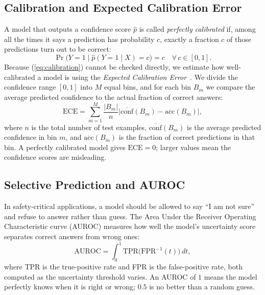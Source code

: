 \documentclass[twoside]{article}
\begin{document}
\subsection{Calibration and Expected Calibration Error}

A model that outputs a confidence score $\hat{p}$ is called
\emph{perfectly calibrated} if, among all the times it says a prediction
has probability $c$, exactly a fraction $c$ of those predictions turn
out to be correct:
\begin{equation}
  \Pr\!\bigl(Y=1 \mid \hat{p}(Y=1 \mid X)=c\bigr) = c
  \quad \forall\, c\in[0,1].
\label{eq:calibration}
\end{equation}
Because (\ref{eq:calibration}) cannot be checked directly, we estimate
how well-calibrated a model is using the \emph{Expected Calibration
Error}~\cite{naeini2015obtaining}. We divide the confidence range $[0,1]$
into $M$ equal bins, and for each bin $B_m$ we compare the average
predicted confidence to the actual fraction of correct answers:
\begin{equation}
  \mathrm{ECE} =
  \sum_{m=1}^{M} \frac{|B_m|}{n}
  \bigl|\overline{\mathrm{conf}}(B_m) - \overline{\mathrm{acc}}(B_m)\bigr|,
  \label{eq:ece}
\end{equation}
where $n$ is the total number of test examples,
$\overline{\mathrm{conf}}(B_m)$ is the average predicted confidence in
bin $m$, and $\overline{\mathrm{acc}}(B_m)$ is the fraction of correct
predictions in that bin. A perfectly calibrated model gives
$\mathrm{ECE}=0$; larger values mean the confidence scores are
misleading.

\subsection{Selective Prediction and AUROC}

In safety-critical applications, a model should be allowed to say
``I am not sure'' and refuse to answer rather than guess. The Area Under
the Receiver Operating Characteristic curve (AUROC) measures how well
the model's uncertainty score separates correct answers from wrong ones:
\begin{equation}
  \mathrm{AUROC} = \int_0^1 \mathrm{TPR}\bigl(\mathrm{FPR}^{-1}(t)\bigr)\,dt,
\end{equation}
where TPR is the true-positive rate and FPR is the false-positive rate,
both computed as the uncertainty threshold varies. An AUROC of $1$ means
the model perfectly knows when it is right or wrong; $0.5$ is no better
than a random guess.
\end{document}

